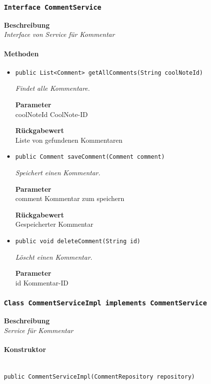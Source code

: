     \subsubsection{\texttt{Interface CommentService}}
    \textbf{Beschreibung} \\
    \textit{Interface von Service für Kommentar}
    \paragraph*{Methoden}
    \begin{itemize}
    	\item{\texttt{public List<Comment> getAllComments(String coolNoteId)}}
    	
    	\textit{Findet alle Kommentare.}
    	
    	\textbf{Parameter} \\
    	coolNoteId CoolNote-ID
    	
    	\textbf{Rückgabewert} \\
    	Liste von gefundenen Kommentaren        \item{\texttt{public Comment saveComment(Comment comment)}}
    	
    	\textit{Speichert einen Kommentar.}
    	
    	\textbf{Parameter} \\
    	comment Kommentar zum speichern
    	
    	\textbf{Rückgabewert} \\
    	Gespeicherter Kommentar        \item{\texttt{public void deleteComment(String id)}}
    	
    	\textit{Löscht einen Kommentar.}
    	
    	\textbf{Parameter} \\
    	id Kommentar-ID
    	
    	
    \end{itemize}
    \subsubsection{\texttt{Class CommentServiceImpl implements CommentService}}
    \textbf{Beschreibung} \\
    \textit{Service für Kommentar}
    \paragraph*{Konstruktor}\mbox{} \\
    \texttt{public CommentServiceImpl(CommentRepository repository)} \\
